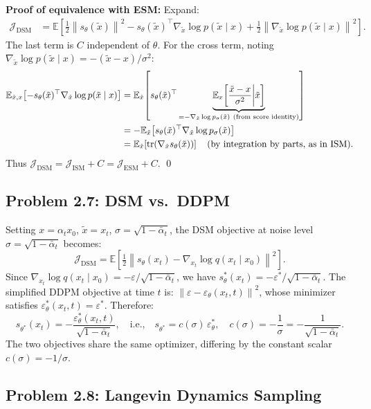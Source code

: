 \documentclass[11pt]{article}
\newcommand{\E}{\mathbb{E}}
\newcommand{\norm}[1]{\left\|#1\right\|}
\newcommand{\abar}{\bar{\alpha}}
\newcommand{\sth}{s_\theta}
\newcommand{\epsth}{\varepsilon_\theta}
\begin{document}
\textbf{Proof of equivalence with ESM:}
Expand:
\begin{align*}
\mathcal{J}_\mathrm{DSM}
&= \E\!\left[\tfrac{1}{2}\norm{\sth(\tilde x)}^2
            - \sth(\tilde x)^\top\nabla_{\tilde x}\log p(\tilde x\mid x)
            + \tfrac{1}{2}\norm{\nabla_{\tilde x}\log p(\tilde x\mid x)}^2\right].
\end{align*}
The last term is $C$ independent of $\theta$. For the cross term, noting
$\nabla_{\tilde x}\log p(\tilde x\mid x)=-(\tilde x - x)/\sigma^2$:
\begin{align*}
\E_{\tilde x,x}\!\left[-\sth(\tilde x)^\top\nabla_{\tilde x}\log p(\tilde x\mid x)\right]
&= \E_{\tilde x}\!\left[\sth(\tilde x)^\top
    \underbrace{\E_x\!\left[\frac{\tilde x-x}{\sigma^2}\bigg|\tilde x\right]}_{%
    = -\nabla_{\tilde x}\log p_\sigma(\tilde x)\ \text{(from score identity)}}\right]\\
&= -\E_{\tilde x}\!\left[\sth(\tilde x)^\top\nabla_{\tilde x}\log p_\sigma(\tilde x)\right]\\
&= \E_{\tilde x}\!\left[\mathrm{tr}(\nabla_{\tilde x}\sth(\tilde x))\right]
   \quad\text{(by integration by parts, as in ISM)}.
\end{align*}
Thus $\mathcal{J}_\mathrm{DSM} = \mathcal{J}_\mathrm{ISM} + C = \mathcal{J}_\mathrm{ESM} + C$. \qed

\subsection{Problem 2.7: DSM vs.\ DDPM}

Setting $x=\alpha_t x_0$, $\tilde x = x_t$, $\sigma=\sqrt{1-\abar_t}$, the
DSM objective at noise level $\sigma=\sqrt{1-\abar_t}$ becomes:
\[
\mathcal{J}_\mathrm{DSM}
= \E\!\left[\tfrac{1}{2}\norm{\sth(x_t) - \nabla_{x_t}\log q(x_t\mid x_0)}^2\right].
\]
Since $\nabla_{x_t}\log q(x_t\mid x_0) = -\varepsilon/\sqrt{1-\abar_t}$, we have
$\sth^*(x_t) = -\varepsilon^*/\sqrt{1-\abar_t}$.
The simplified DDPM objective at time $t$ is:
$\norm{\varepsilon-\epsth(x_t,t)}^2$,
whose minimizer satisfies $\epsth^*(x_t,t)=\varepsilon^*$.
Therefore:
\[
s_{\theta^*}(x_t) = -\frac{\epsth^*(x_t,t)}{\sqrt{1-\abar_t}},
\quad\text{i.e.,}\quad
s_{\theta^*} = c(\sigma)\,\epsth^*, \quad c(\sigma) = -\frac{1}{\sigma} = -\frac{1}{\sqrt{1-\abar_t}}.
\]
The two objectives share the same optimizer, differing by the constant scalar $c(\sigma)=-1/\sigma$.

\subsection{Problem 2.8: Langevin Dynamics Sampling}
\end{document}
